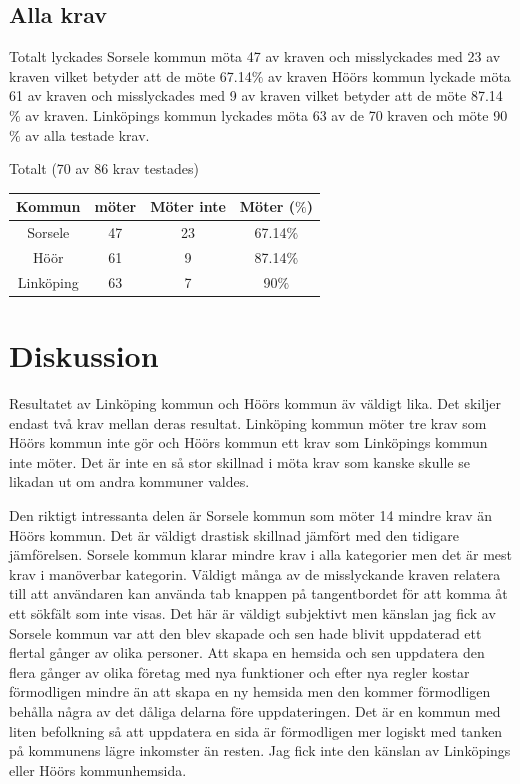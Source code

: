 \documentclass[11p]{article}
\begin{document}
    \subsection{Alla krav}
    Totalt lyckades Sorsele kommun möta 47 av kraven och misslyckades med 23 av kraven vilket betyder att de möte 67.14$\%$ av kraven
    Höörs kommun lyckade möta 61 av kraven och misslyckades med 9 av kraven vilket betyder att de möte 87.14$\%$ av kraven.
    Linköpings kommun lyckades möta 63 av de 70 kraven och möte 90$\%$ av alla testade krav.

    \begin{center}
    Totalt (70 av 86 krav testades)

    \begin{tabular}{ |c|c|c|c|}
        \hline
        Kommun & möter & Möter inte & Möter ($\%$) \\  \hline
        Sorsele & 47 & 23 & 67.14$\%$ \\ \hline
        Höör & 61 & 9 & 87.14$\%$ \\ \hline
        Linköping & 63 & 7 & 90$\%$ \\ \hline
    \end{tabular}
    \end{center}

    \section{Diskussion}
    Resultatet av Linköping kommun och Höörs kommun äv väldigt lika.
    Det skiljer endast två krav mellan deras resultat.
    Linköping kommun möter tre krav som Höörs kommun inte gör och Höörs kommun ett krav som Linköpings kommun inte möter.
    Det är inte en så stor skillnad i möta krav som kanske skulle se likadan ut om andra kommuner valdes.

    Den riktigt intressanta delen är Sorsele kommun som möter 14 mindre krav än Höörs kommun.
    Det är väldigt drastisk skillnad jämfört med den tidigare jämförelsen.
    Sorsele kommun klarar mindre krav i alla kategorier men det är mest krav i manöverbar kategorin.
    Väldigt många av de misslyckande kraven relatera till att användaren kan använda tab knappen på tangentbordet för att komma åt ett sökfält som inte visas.
    Det här är väldigt subjektivt men känslan jag fick av Sorsele kommun var att den blev skapade och sen hade blivit uppdaterad ett flertal gånger av olika personer.
    Att skapa en hemsida och sen uppdatera den flera gånger av olika företag med nya funktioner och efter nya regler kostar förmodligen mindre än att skapa en ny hemsida men den kommer förmodligen behålla några av det dåliga delarna före uppdateringen.
    Det är en kommun med liten befolkning så att uppdatera en sida är förmodligen mer logiskt med tanken på kommunens lägre inkomster än resten.
    Jag fick inte den känslan av Linköpings eller Höörs kommunhemsida.
\end{document}
